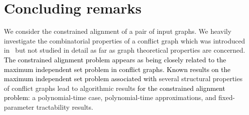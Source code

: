 \documentclass[final]{dmtcs-episciences}
\newcommand\mar[1]{\textcolor{black}{#1}}
\begin{document}
\section{Concluding remarks}\label{sec:conclude}

We consider the constrained alignment of a pair of input graphs. 
We heavily investigate the combinatorial properties of a conflict graph 
which was introduced in~\citet{Fertin200990} but not studied in detail as far 
as graph theoretical properties are concerned. \mar{The constrained alignment problem appears as being closely related to the maximum independent set problem in conflict graphs.}
\mar{Known results on the maximum independent set problem associated with} several structural properties of conflict graphs lead to algorithmic results \mar{for the constrained alignment problem}: a polynomial-time  case, polynomial-time
approximations, and fixed-parameter tractability results.  
\end{document}
